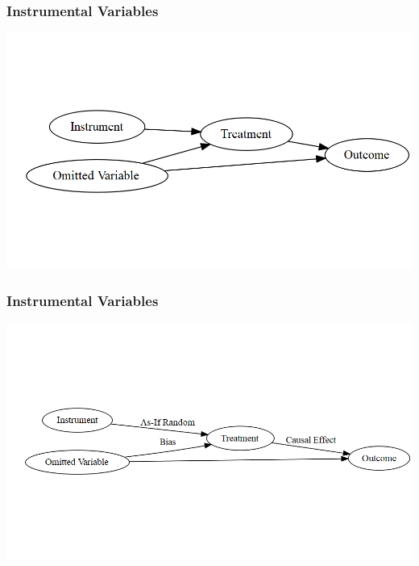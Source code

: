 \documentclass[xcolor=x11names,compress]{beamer}\usepackage[]{graphicx}\usepackage[]{color}
\makeatletter
\def\maxwidth{ %
  \ifdim\Gin@nat@width>\linewidth
    \linewidth
  \else
    \Gin@nat@width
  \fi
}
\newenvironment{knitrout}{}{} %
\renewcommand{\(}{\begin{columns}}
\renewcommand{\)}{\end{columns}}
\newcommand{\<}[1]{\begin{column}{#1}}
\renewcommand{\>}{\end{column}}
\makeatother
\begin{document}
\begin{frame}
\frametitle{Instrumental Variables}
\begin{knitrout}
\color{fgcolor}
\includegraphics[width=\maxwidth]{figure/dag2-1} 

\end{knitrout}
\end{frame}

\begin{frame}
\frametitle{Instrumental Variables}
\begin{knitrout}
\color{fgcolor}
\includegraphics[width=\maxwidth]{figure/dag3-1} 

\end{knitrout}
\end{frame}
\end{document}
